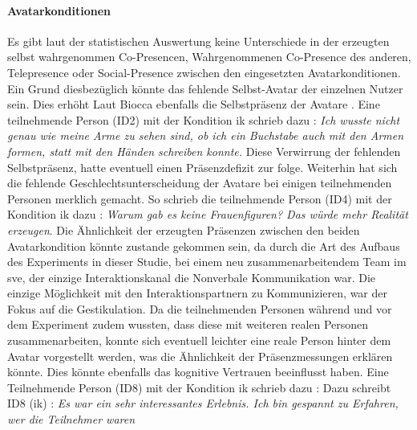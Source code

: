 \documentclass[a4paper,11pt]{article}%
\renewcommand{\\}{\vspace*{0.5\baselineskip} \newline}
\begin{document}
\paragraph{Avatarkonditionen}
Es gibt laut der statistischen Auswertung keine Unterschiede in der erzeugten selbst wahrgenommen Co-Presencen, Wahrgenommenen Co-Presence des anderen, Telepresence oder Social-Presence zwischen den eingesetzten Avatarkonditionen. 
Ein Grund diesbezüglich könnte das fehlende Selbst-Avatar der einzelnen Nutzer sein. Dies erhöht Laut Biocca ebenfalls die Selbstpräsenz der Avatare \citep[421-427]{construal2014connected}.
Eine teilnehmende Person (ID2) mit der Kondition \ac{ik} schrieb dazu : \\
\dq{}\textit{Ich wusste nicht genau wie meine Arme zu sehen sind, ob ich ein Buchstabe auch mit den Armen formen, statt mit den Händen schreiben konnte.}\dq{}\\
Diese Verwirrung der fehlenden Selbstpräsenz, hatte eventuell einen Präsenzdefizit zur folge.
Weiterhin hat sich die fehlende Geschlechtsunterscheidung der Avatare bei einigen teilnehmenden Personen merklich gemacht. So schrieb die teilnehmende Person (ID4) mit der Kondition \ac{ik} dazu :\\
\dq{}\textit{Warum gab es keine Frauenfiguren? Das würde mehr Realität erzeugen}\dq{}.\\
Die Ähnlichkeit der erzeugten Präsenzen zwischen den beiden Avatarkondition könnte zustande gekommen sein, da durch die Art des Aufbaus des Experiments in dieser Studie, bei einem neu zusammenarbeitendem Team im \ac{sve}, der einzige Interaktionskanal die Nonverbale Kommunikation war. Die einzige Möglichkeit mit den Interaktionspartnern zu Kommunizieren, war der Fokus auf die Gestikulation. Da die teilnehmenden Personen während und vor dem Experiment zudem wussten, dass diese mit weiteren \dq{}realen\dq{} Personen zusammenarbeiten, konnte sich eventuell leichter eine reale Person hinter dem Avatar vorgestellt werden, was die Ähnlichkeit der Präsenzmessungen erklären könnte. Dies könnte ebenfalls das kognitive Vertrauen beeinflusst haben.
Eine Teilnehmende Person (ID8) mit der Kondition \ac{ik} schrieb dazu : \\ 
Dazu schreibt ID8 (\ac{ik}) : \dq{}\textit{Es war ein sehr interessantes Erlebnis. Ich bin gespannt zu Erfahren, wer die Teilnehmer waren}\dq{}\\
\end{document}
